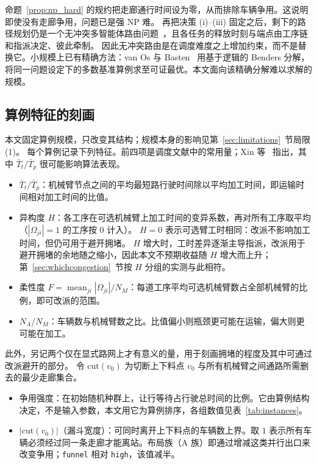 \documentclass[manuscript,screen,review]{acmart}
\begin{document}
命题~\ref{prop:np_hard} 的规约把走廊通行时间设为零，从而排除车辆争用。这说明即使没有走廊争用，问题已是强 NP 难。
再把决策 (i)--(iii) 固定之后，剩下的路径规划仍是一个无冲突多智能体路由问题~\cite{gao2023mapf}，且各任务的释放时刻与端点由工序链和指派决定、彼此牵制。
因此无冲突路由是在调度难度之上增加约束，而不是替换它。小规模上已有精确方法：van Os 与 Basten~\cite{vanos2026exact} 用基于逻辑的 Benders 分解，
将同一问题设定下的多数基准算例求至可证最优。本文面向该精确分解难以求解的规模。

\subsection{算例特征的刻画}
\label{sec:features}

本文固定算例规模，只改变其结构；规模本身的影响见第~\ref{sec:limitations}~节局限 (1)。
每个算例记录下列特征。前四项是调度文献中的常用量；Xin 等~\cite{xin2025review} 指出，其中 $\bar{T}_t/\bar{T}_p$ 很可能影响算法表现。


\begin{itemize}[leftmargin=*,topsep=2pt,itemsep=1pt]
  \item $\bar{T}_t/\bar{T}_p$：机械臂节点之间的平均最短路行驶时间除以平均加工时间，即运输时间相对加工时间的比值。
  \item 异构度 $H$：各工序在可选机械臂上加工时间的变异系数，再对所有工序取平均（$|\Omega_{ji}|=1$ 的工序按 $0$ 计入）。
  $H=0$ 表示可选臂工时相同：改派不影响加工时间，但仍可用于避开拥堵。
  $H$ 增大时，工时差异逐渐主导指派，改派用于避开拥堵的余地随之缩小，因此本文不预期收益随 $H$ 增大而上升；第~\ref{sec:whichcongestion}~节按 $H$ 分组的实测与此相符。
  \item 柔性度 $F=\operatorname{mean}_{ji}|\Omega_{ji}|/N_M$：每道工序平均可选机械臂数占全部机械臂的比例，即可改派的范围。
  \item $N_A/N_M$：车辆数与机械臂数之比。比值偏小则瓶颈更可能在运输，偏大则更可能在加工。
\end{itemize}

此外，另记两个仅在显式路网上才有意义的量，用于刻画拥堵的程度及其中可通过改派避开的部分。
令 $\mathrm{cut}(v_0)$ 为切断上下料点 $v_0$ 与所有机械臂之间通路所需删去的最少走廊集合。

\begin{itemize}[leftmargin=*,topsep=2pt,itemsep=1pt]
  \item 争用强度：在初始随机种群上，让行等待占行驶总时间的比例。它由算例结构决定，不是输入参数，本文用它为算例排序，各组数值见表~\ref{tab:instances}。
  \item $|\mathrm{cut}(v_0)|$（漏斗宽度）：可同时离开上下料点的车辆数上界。取 $1$ 表示所有车辆必须经过同一条走廊才能离站。布局族（A 族）即通过增减这类并行出口来改变争用；\texttt{funnel} 相对 \texttt{high}，该值减半。
\end{itemize}
\end{document}
